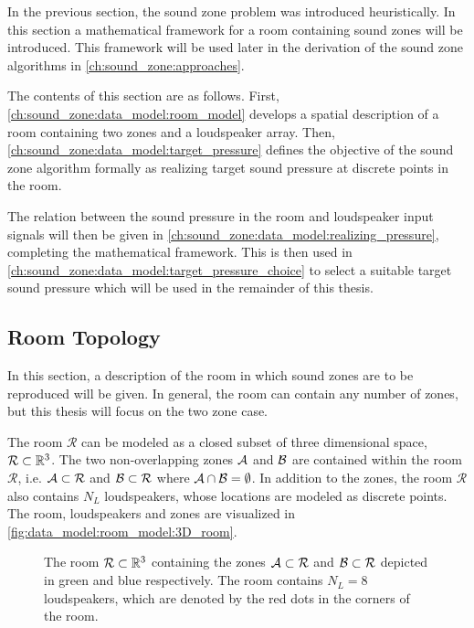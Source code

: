 In the previous section, the sound zone problem was introduced heuristically.
In this section a mathematical framework for a room containing sound zones will be introduced.
This framework will be used later in the derivation of the sound zone algorithms in \autoref{ch:sound_zone:approaches}.

The contents of this section are as follows.
First, \autoref{ch:sound_zone:data_model:room_model} develops a spatial description of a room containing
two zones and a loudspeaker array.
Then, \autoref{ch:sound_zone:data_model:target_pressure} defines the objective of the sound zone algorithm formally
as realizing target sound pressure at discrete points in the room.

The relation between the sound pressure in the room and loudspeaker input signals will then be given in
\autoref{ch:sound_zone:data_model:realizing_pressure}, completing the mathematical framework.
This is then used in \autoref{ch:sound_zone:data_model:target_pressure_choice} to select a suitable target
sound pressure which will be used in the remainder of this thesis.

\subsection{Room Topology}
\label{ch:sound_zone:data_model:room_model}
In this section, a description of the room in which sound zones are to be reproduced will be given.
In general, the room can contain any number of zones, but this thesis will focus on the two zone case. 

The room $\mathcal{R}$ can be modeled as a closed subset of three dimensional space, $\mathcal{R} \subset \mathbb{R}^{3}$.
The two non-overlapping zones $\mathcal{A}$ and $\mathcal{B}$ are contained within the room $\mathcal{R}$, 
i.e. $\mathcal{A} \subset \mathcal{R}$ and $\mathcal{B} \subset \mathcal{R}$ where $\mathcal{A} \cap \mathcal{B} = \emptyset$.
In addition to the zones, the room $\mathcal{R}$ also contains $N_L$ loudspeakers, whose locations are modeled as discrete points.
The room, loudspeakers and zones are visualized in \autoref{fig:data_model:room_model:3D_room}.

\begin{figure}
    \centering
    
    \caption{The room $\mathcal{R}\subset \mathbb{R}^{3}$ containing the zones $\mathcal{A}\subset\mathcal{R}$ 
    and $\mathcal{B}\subset\mathcal{R}$ depicted in green and blue respectively. 
    The room contains $N_L = 8$ loudspeakers, which are denoted by the red dots in the corners of the room.}
    \label{fig:data_model:room_model:3D_room}
\end{figure}

